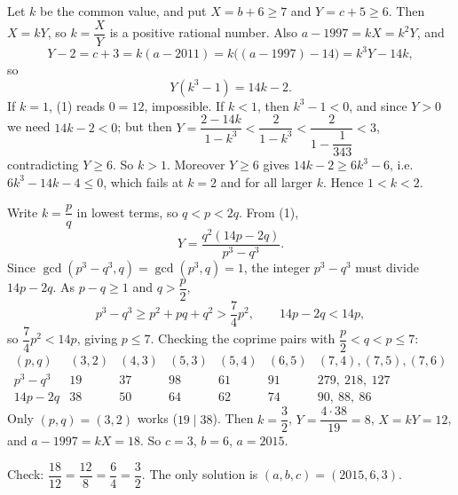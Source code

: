 Let $k$ be the common value, and put $X=b+6\ge7$ and $Y=c+5\ge6$. Then $X=kY$, so $k=\dfrac {X}{Y}$ is a positive rational number. Also $a-1997=kX=k^2Y$, and
\[Y-2=c+3=k(a-2011)=k\bigl((a-1997)-14\bigr)=k^3Y-14k,\]
so
\[Y(k^3-1)=14k-2 .\tag{1}\]
If $k=1$, (1) reads $0=12$, impossible. If $k<1$, then $k^3-1<0$, and since $Y>0$ we need $14k-2<0$; but then $Y=\dfrac{2-14k}{1-k^3}<\dfrac{2}{1-k^3}<\dfrac{2}{1-\dfrac{1}{343}}<3$, contradicting $Y\ge6$. So $k>1$. Moreover $Y\ge6$ gives $14k-2\ge6k^3-6$, i.e.\ $6k^3-14k-4\le0$, which fails at $k=2$ and for all larger $k$. Hence $1<k<2$.

Write $k=\dfrac {p}{q}$ in lowest terms, so $q<p<2q$. From (1),
\[Y=\dfrac{q^2(14p-2q)}{p^3-q^3}.\]
Since $\gcd(p^3-q^3,q)=\gcd(p^3,q)=1$, the integer $p^3-q^3$ must divide $14p-2q$. As $p-q\ge1$ and $q>\dfrac {p}{2}$,
\[p^3-q^3\ge p^2+pq+q^2>\dfrac{7}{4}p^2,\qquad 14p-2q<14p,\]
so $\dfrac{7}{4}p^2<14p$, giving $p\le7$. Checking the coprime pairs with $\dfrac {p}{2}<q<p\le7$:
\[\begin{array}{c|ccccccc}
(p,q)&(3,2)&(4,3)&(5,3)&(5,4)&(6,5)&(7,4),(7,5),(7,6)\\\hline
p^3-q^3&19&37&98&61&91&279,\ 218,\ 127\\
14p-2q&38&50&64&62&74&90,\ 88,\ 86
\end{array}\]
Only $(p,q)=(3,2)$ works ($19\mid38$). Then $k=\dfrac{3}{2}$, $Y=\dfrac{4\cdot38}{19}=8$, $X=kY=12$, and $a-1997=kX=18$. So $c=3$, $b=6$, $a=2015$.

Check: $\dfrac{18}{12}=\dfrac{12}{8}=\dfrac{6}{4}=\dfrac{3}{2}$. The only solution is $\boxed{(a,b,c)=(2015,6,3)}$.
